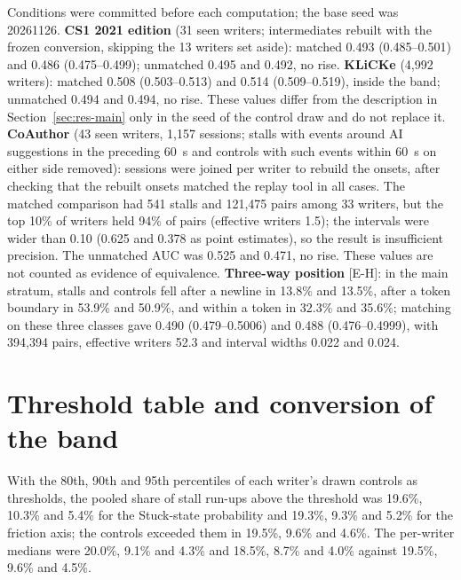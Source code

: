 Conditions were committed before each computation; the base seed was 20261126. \textbf{CS1 2021 edition} (31 seen
writers; intermediates rebuilt with the frozen conversion, skipping the 13 writers set aside): matched 0.493
(0.485--0.501) and 0.486 (0.475--0.499); unmatched 0.495 and 0.492, no rise. \textbf{KLiCKe} (4,992 writers): matched
0.508 (0.503--0.513) and 0.514 (0.509--0.519), inside the band; unmatched 0.494 and 0.494, no rise. These values differ
from the description in Section~\ref{sec:res-main} only in the seed of the control draw and do not replace it.
\textbf{CoAuthor} (43 seen writers, 1,157 sessions; stalls with events around AI suggestions in the preceding 60~s and
controls with such events within 60~s on either side removed): sessions were joined per writer to rebuild the onsets,
after checking that the rebuilt onsets matched the replay tool in all cases. The matched comparison had 541 stalls and
121,475 pairs among 33 writers, but the top 10\% of writers held 94\% of pairs (effective writers 1.5); the intervals were
wider than 0.10 (0.625 and 0.378 as point estimates), so the result is insufficient precision. The unmatched AUC was
0.525 and 0.471, no rise. These values are not counted as evidence of equivalence. \textbf{Three-way position} [E-H]:
in the main stratum, stalls and controls fell after a newline in 13.8\% and 13.5\%, after a token boundary in 53.9\% and
50.9\%, and within a token in 32.3\% and 35.6\%; matching on these three classes gave 0.490 (0.479--0.5006) and 0.488
(0.476--0.4999), with 394,394 pairs, effective writers 52.3 and interval widths 0.022 and 0.024.

\section{Threshold table and conversion of the band}
\label{app:threshold}

With the 80th, 90th and 95th percentiles of each writer's drawn controls as thresholds, the pooled share of stall
run-ups above the threshold was 19.6\%, 10.3\% and 5.4\% for the Stuck-state probability and 19.3\%, 9.3\% and 5.2\% for
the friction axis; the controls exceeded them in 19.5\%, 9.6\% and 4.6\%. The per-writer medians were 20.0\%, 9.1\% and
4.3\% and 18.5\%, 8.7\% and 4.0\% against 19.5\%, 9.6\% and 4.5\%.

